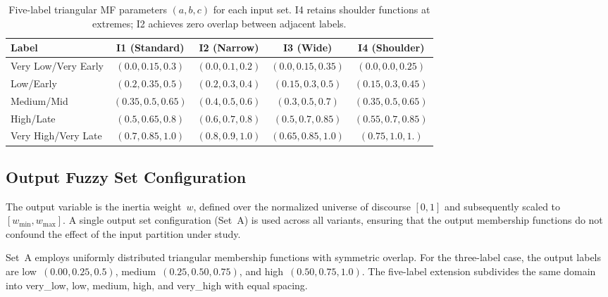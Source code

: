 \begin{table}[htbp]
    \caption{Five-label triangular MF parameters $(a, b, c)$ for each input set. I4 retains shoulder functions at extremes; I2 achieves zero overlap between adjacent labels.}
    \label{tab:input_sets_5L}
    \centering
    \begin{tabular}{lcccc}
    \toprule
    Label & I1 (Standard) & I2 (Narrow) & I3 (Wide) & I4 (Shoulder) \\
    \midrule
    Very Low/Very Early & $(0.0, 0.15, 0.3)$  & $(0.0, 0.1, 0.2)$  & $(0.0, 0.15, 0.35)$  & $(0.0, 0.0, 0.25)$  \\
    Low/Early           & $(0.2, 0.35, 0.5)$  & $(0.2, 0.3, 0.4)$  & $(0.15, 0.3, 0.5)$ & $(0.15, 0.3, 0.45)$ \\
    Medium/Mid          & $(0.35, 0.5, 0.65)$ & $(0.4, 0.5, 0.6)$  & $(0.3, 0.5, 0.7)$  & $(0.35, 0.5, 0.65)$ \\
    High/Late           & $(0.5, 0.65, 0.8)$  & $(0.6, 0.7, 0.8)$  & $(0.5, 0.7, 0.85)$  & $(0.55, 0.7, 0.85)$ \\
    Very High/Very Late & $(0.7, 0.85, 1.0)$  & $(0.8, 0.9, 1.0)$  & $(0.65, 0.85, 1.0)$ & $(0.75, 1.0, 1.)$  \\
    \bottomrule
    \end{tabular}
\end{table}

\subsection{Output Fuzzy Set Configuration}
\label{subsec:output_set}

The output variable is the inertia weight~$w$, defined over the normalized universe of discourse $[0, 1]$ and subsequently scaled to $[w_{\min}, w_{\max}]$. A single output set configuration (Set~A) is used across all variants, ensuring that the output membership functions do not confound the effect of the input partition under study.

Set~A employs uniformly distributed triangular membership functions with symmetric overlap. For the three-label case, the output labels are low~$(0.00, 0.25, 0.5)$, medium~$(0.25, 0.50, 0.75)$, and high~$(0.50, 0.75, 1.0)$. The five-label extension subdivides the same domain into very\_low, low, medium, high, and very\_high with equal spacing. 


